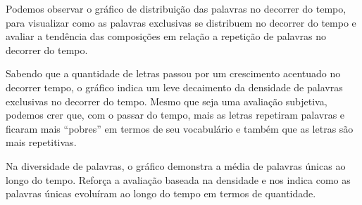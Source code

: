 \documentclass[]{article}
\begin{document}
Podemos observar o gráfico de distribuição das palavras no decorrer do
tempo, para visualizar como as palavras exclusivas se distribuem no
decorrer do tempo e avaliar a tendência das composições em relação a
repetição de palavras no decorrer do tempo.

Sabendo que a quantidade de letras passou por um crescimento acentuado
no decorrer tempo, o gráfico indica um leve decaimento da densidade de
palavras exclusivas no decorrer do tempo. Mesmo que seja uma avaliação
subjetiva, podemos crer que, com o passar do tempo, mais as letras
repetiram palavras e ficaram mais ``pobres'' em termos de seu
vocabulário e também que as letras são mais repetitivas.

Na diversidade de palavras, o gráfico demonstra a média de palavras
únicas ao longo do tempo. Reforça a avaliação baseada na densidade e nos
indica como as palavras únicas evoluíram ao longo do tempo em termos de
quantidade.
\end{document}
